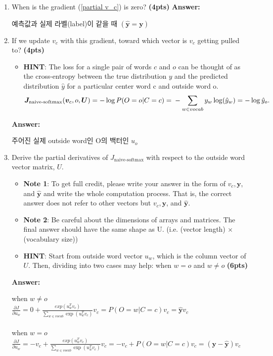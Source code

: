 \documentclass{assignment format}
\newenvironment{answer}{
    {\bf Answer:} \begingroup\color{red}
}{\endgroup}%
\begin{document}
\begin{enumerate}[label=(\alph*)]
	\item When is the gradient (\ref{partial v_c}) is zero? \textbf{(4pts)}
    \begin{answer}
    예측값과 실제 라벨(label)이 같을 때 $(\hat{\mathbf{y}} = {\mathbf{y}})$
    \end{answer}
    \item  If we update $v_c$ with this gradient, toward which vector is $v_c$ getting pulled to?  \textbf{(4pts)}
    \begin{itemize}
    \item \textbf{HINT}: The loss for a single pair of words $c$ and $o$ can be thought of as the cross-entropy between the true distribution \textbf{$y$} and the predicted distribution \textbf{$\hat{y}$} for a particular center word c and outside word o.
\begin{equation} 
\bm J_{\text{naive-softmax}}(\bm v_c, o, \bm U) = -\log P(O=o| C=c) =\\-\sum_{w \in vocab}y_w\log(\hat{y}_w)=-\log{\hat{y}_o}.
\label{naive-softmax}
\end{equation}

\end{itemize}
  \begin{answer}
    주어진 실제 outside word인 O의 백터인 $u_{o}$
    \end{answer}  
    \item Derive the partial derivatives of $J_{\text{naive-softmax}}$ with respect to the outside word vector matrix, $U$.
    \begin{itemize} 
\item \textbf{Note 1}: To get full credit, please write your answer in the form of $v_c, \mathbf{y}$, and $\hat{\mathbf{y}}$ and write the whole computation process. That is, the correct answer does not refer to other vectors but $v_c, \mathbf{y}$, and $\hat{\mathbf{y}}$. 
\item \textbf{Note 2}: Be careful about the dimensions of arrays and matrices. The final answer should have the same shape as U. (i.e. (vector length) $\times$ (vocabulary size)) 
\item\textbf{HINT}: Start from outside word vector $u_w$, which is the column vector of $U$. Then, dividing into two cases may help: when $w=o$ and $w \neq o$ \textbf{(6pts)}
\end{itemize}
\begin{answer}
when $w \neq o$ \\
$\frac{\partial J}{\partial u_w} = 0 + \frac{exp(u_w^Tv_c)}{\sum_{w\in vocab}\exp(u_w^Tv_c)}{v_c} = P(O=w | C=c){v_c} = \hat{\mathbf{y}}{v_c}$ \\ \\
when $w = o$ \\
$\frac{\partial J}{\partial u_w} = -{v_c} + \frac{exp(u_w^Tv_c)}{\sum_{w\in vocab}\exp(u_w^Tv_c)}{v_c} = -{v_c} + P(O=w | C=c){v_c} = ({\mathbf{y}}-\hat{\mathbf{y}}){v_c}$ 
    \end{answer}
\end{enumerate}
\end{document}
